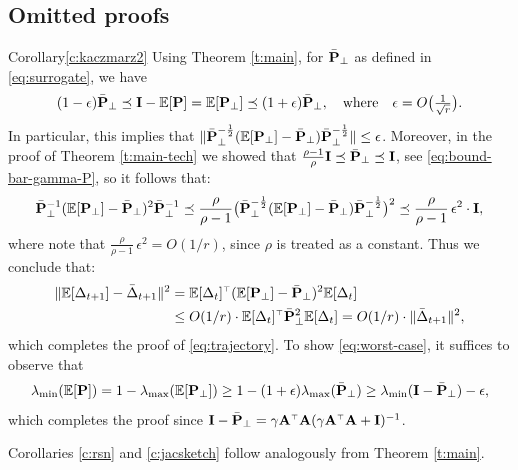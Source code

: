 \documentclass[thesis.tex]{subfiles}
\begin{document}
\subsection{Omitted proofs}
\begin{proofof}{Corollary}{\ref{c:kaczmarz2}}
Using Theorem \ref{t:main}, for $\bar\P_{\perp}$ as defined in \eqref{eq:surrogate}, we have
  \begin{align*}
    (1-\epsilon)\bar\P_{\perp}\preceq \I-\E[\P] =
    \E[\P_{\perp}]\preceq(1+\epsilon)\bar\P_{\perp},
    \quad\text{where}\quad\epsilon=O\big(\tfrac 1{\sqrt r}\big).
  \end{align*}
In particular, this implies that
$\|\bar\P_{\perp}^{-\frac12}(\E[\P_{\perp}]-\bar\P_{\perp})\bar\P_{\perp}^{-\frac12}\|\leq\epsilon$.
Moreover, in the proof of Theorem \ref{t:main-tech} we showed that
  $\frac{\rho-1}\rho\I\preceq\bar\P_{\perp}\preceq\I$, see
  \eqref{eq:bound-bar-gamma-P}, so it follows that:
  \begin{align*}
    \bar\P_{\perp}^{-1}(\E[\P_{\perp}]-\bar\P_{\perp})^2\bar\P_{\perp}^{-1}\preceq
    \frac{\rho}{\rho-1}\big(\bar\P_{\perp}^{-\frac12}(\E[\P_{\perp}]-\bar\P_{\perp})\bar\P_{\perp}^{-\frac12}\big)^2
    \preceq     \frac{\rho}{\rho-1}\,\epsilon^2\cdot \I,
  \end{align*}
  where note that  $\frac{\rho}{\rho-1}\,\epsilon^2=O(1/r)$, since
  $\rho$ is treated as a constant. Thus we conclude that:
  \begin{align*}
    \|\E[\Delta_{t+1}]-\bar\Delta_{t+1}\|^2
    &=\E[\Delta_t]^\top(\E[\P_{\perp}]-\bar\P_{\perp})^2\E[\Delta_t]
    \\
    &\leq O(1/r)\cdot \E[\Delta_t]^\top\bar\P_{\perp}^2\E[\Delta_t] =
      O(1/r)\cdot \|\bar\Delta_{t+1}\|^2,
  \end{align*}
  which completes the proof of \eqref{eq:trajectory}. To show
  \eqref{eq:worst-case}, it suffices to observe that
  \begin{align*}
    \lambda_{\min}(\E[\P])
    = 1- \lambda_{\max}(\E[\P_{\perp}])
    \geq 1-(1+\epsilon)\lambda_{\max}(\bar\P_{\perp})
    \geq \lambda_{\min}(\I-\bar\P_{\perp}) - \epsilon,
  \end{align*}
  which completes the proof since
  $\I-\bar\P_{\perp}=\gamma\A^\top\A(\gamma\A^\top\A+\I)^{-1}$. 
\end{proofof}

Corollaries \ref{c:rsn} and \ref{c:jacsketch} follow analogously from
Theorem \ref{t:main}.
\end{document}
